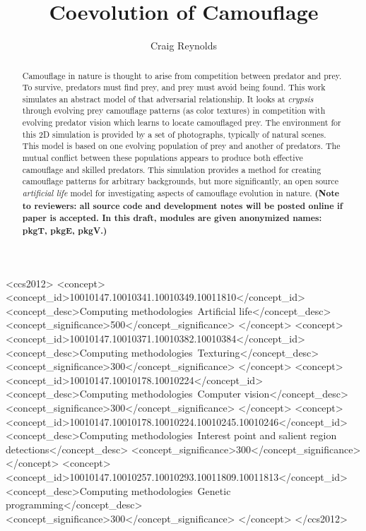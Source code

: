 \documentclass[acmtog]{acmart}
\newcommand{\texsyn}[0]{pkgT}
\newcommand{\lazypredator}[0]{pkgE}
\newcommand{\predatoreye}[0]{pkgV}
\begin{document}
\title{Coevolution of Camouflage}

\author{Craig Reynolds}

\renewcommand{\shortauthors}{Craig Reynolds}


\begin{abstract}
    Camouflage in nature is thought to arise from competition between predator and prey. To survive, predators must find prey, and prey must avoid being found. This work simulates an abstract model of that adversarial relationship. It looks at \textit{crypsis} through evolving prey camouflage patterns (as color textures) in competition with evolving predator vision which learns to locate camouflaged prey. The environment for this 2D simulation is provided by a set of photographs, typically of natural scenes. This model is based on one evolving population of prey and another of predators. The mutual conflict between these populations appears to produce both effective camouflage and skilled predators. This simulation provides a method for creating camouflage patterns for arbitrary backgrounds, but more significantly, an open source \textit{artificial life} model for investigating aspects of camouflage evolution in nature. \textbf{(Note to reviewers: all source code and development notes will be posted online if paper is accepted. In this draft, modules are given anonymized names: \texsyn{}, \lazypredator{}, \predatoreye{}.)}
\end{abstract}


\begin{CCSXML}
<ccs2012>
   <concept>
       <concept_id>10010147.10010341.10010349.10011810</concept_id>
       <concept_desc>Computing methodologies~Artificial life</concept_desc>
       <concept_significance>500</concept_significance>
       </concept>
   <concept>
       <concept_id>10010147.10010371.10010382.10010384</concept_id>
       <concept_desc>Computing methodologies~Texturing</concept_desc>
       <concept_significance>300</concept_significance>
       </concept>
   <concept>
       <concept_id>10010147.10010178.10010224</concept_id>
       <concept_desc>Computing methodologies~Computer vision</concept_desc>
       <concept_significance>300</concept_significance>
       </concept>
    <concept>
       <concept_id>10010147.10010178.10010224.10010245.10010246</concept_id>
       <concept_desc>Computing methodologies~Interest point and salient region detections</concept_desc>
       <concept_significance>300</concept_significance>
       </concept>
    <concept>
        <concept_id>10010147.10010257.10010293.10011809.10011813</concept_id>
        <concept_desc>Computing methodologies~Genetic programming</concept_desc>
        <concept_significance>300</concept_significance>
        </concept>
 </ccs2012>
\end{CCSXML}
\end{document}
